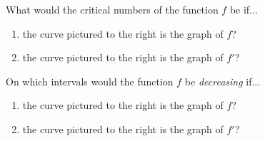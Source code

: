 \documentclass[10pt]{article}
\begin{document}
\begin{minipage}{0.55\textwidth}
  What would the critical numbers of the function $f$ be if...
\begin{enumerate}
\item[(a)] the curve pictured to the right is the graph of $f$?
\item[(b)] the curve pictured to the right is the graph of $f'$?
\end{enumerate}
On which intervals would the function $f$ be {\it decreasing} if...
\begin{enumerate}
\item[(c)] the curve pictured to the right is the graph of $f$?
\item[(d)] the curve pictured to the right is the graph of $f'$?
\end{enumerate}
\end{minipage}
%
\begin{minipage}{0.45\textwidth}
\begin{center}
\end{center}
\end{minipage}\\

\vspace{0.1in}
\end{document}
